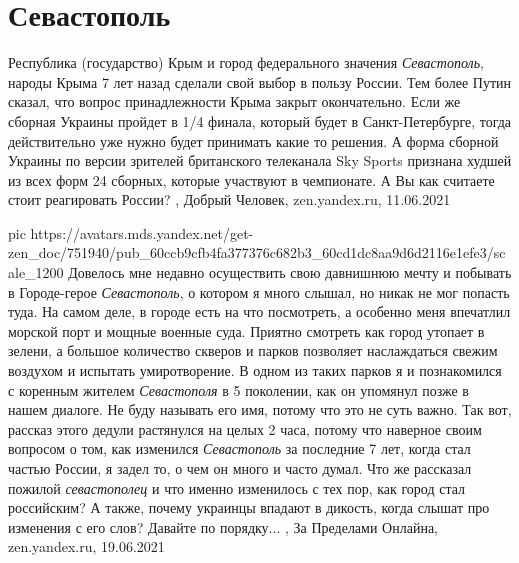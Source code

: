  
 
 
 
 
\chapter{Севастополь}

Республика (государство) Крым и город федерального значения \emph{Севастополь},
народы Крыма 7 лет назад сделали свой выбор в пользу России. Тем более Путин
сказал, что вопрос принадлежности Крыма закрыт окончательно. Если же сборная
Украины пройдет в 1/4 финала, который будет в Санкт-Петербурге, тогда
действительно уже нужно будет принимать какие то решения. А форма сборной
Украины по версии зрителей британского телеканала Sky Sports признана худшей из
всех форм 24 сборных, которые участвуют в чемпионате. А Вы как считаете стоит
реагировать России?
, 
Добрый Человек, zen.yandex.ru, 11.06.2021

\ifcmt
  pic https://avatars.mds.yandex.net/get-zen_doc/751940/pub_60ccb9cfb4fa377376c682b3_60cd1dc8aa9d6d2116e1efe3/scale_1200
\fi
Довелось мне недавно осуществить свою давнишнюю мечту и побывать в Городе-герое
\emph{Севастополь}, о котором я много слышал, но никак не мог попасть туда. На самом
деле, в городе есть на что посмотреть, а особенно меня впечатлил морской порт и
мощные военные суда. Приятно смотреть как город утопает в зелени, а большое
количество скверов и парков позволяет наслаждаться свежим воздухом и испытать
умиротворение.  В одном из таких парков я и познакомился с коренным жителем
\emph{Севастополя} в 5 поколении, как он упомянул позже в нашем диалоге. Не
буду называть его имя, потому что это не суть важно. Так вот, рассказ этого
дедули растянулся на целых 2 часа, потому что наверное своим вопросом о том,
как изменился \emph{Севастополь} за последние 7 лет, когда стал частью России, я задел
то, о чем он много и часто думал. Что же рассказал пожилой \emph{севастополец} и что
именно изменилось с тех пор, как город стал российским? А также, почему
украинцы впадают в дикость, когда слышат про изменения с его слов? Давайте по
порядку...
, 
За Пределами Онлайна, zen.yandex.ru, 19.06.2021

